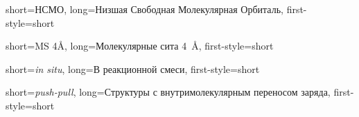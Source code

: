 {
    short={НСМО},
    long={Низшая Свободная Молекулярная Орбиталь},
    first-style=short
}

{
    short={MS 4Å},
    long={Молекулярные сита \SI{4}{\angstrom}},
    first-style=short
}

{
    short={\emph{in situ}},
    long={В реакционной смеси},
    first-style=short
}

{
    short={\emph{push-pull}},
    long={Структуры с внутримолекулярным переносом заряда},
    first-style=short
}